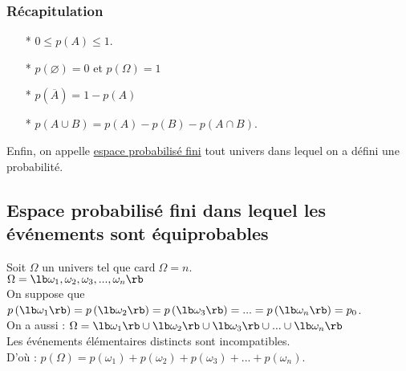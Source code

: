 \subsubsection{Récapitulation}

\begin{itemize}
\item[*]$0 \leq p\left(A\right) \leq 1$. \\
\item[*] $p\left( \varnothing\right) = 0 $ et $ p\left(\Omega\right) = 1$ \\
\item[*] $p\left(\overline{A}\right) = 1 - p\left(A\right) $ \\
\item[*] $p\left( A \cup B \right) = p \left(A \right) - p \left(B \right) - p\left(A \cap B\right) $. \\
\end{itemize}

\vspace*{.3cm}

Enfin, on appelle \underline{espace probabilisé fini} tout univers dans lequel on a défini une probabilité.

\newpage

\subsection{Espace probabilisé fini dans lequel les événements sont équiprobables}

 Soit $\Omega$ un univers tel que $\mathrm{card} \; \Omega = n$. \\
 
 $\Omega = \lb \omega_1 , \omega_2 , \omega_3, ... , \omega_n \rb $ \\
 
 On suppose que $p\left( \lb \omega_1 \rb \right) = p\left( \lb \omega_2 \rb \right) = p\left( \lb \omega_3 \rb \right) = ... = p\left( \lb \omega_n \rb \right) = p_0 $. \\
 
 On a aussi : $\Omega = \lb \omega_1 \rb \cup \lb \omega_2 \rb \cup \lb \omega_3 \rb \cup ... \cup \lb \omega_n \rb$ \\
 
 Les événements élémentaires distincts sont incompatibles. \\ D'où : $p\left(\Omega\right) = p\left(\omega_1\right) + p\left(\omega_2\right) + p\left(\omega_3\right) + ... + p\left(\omega_n\right)$. \\


